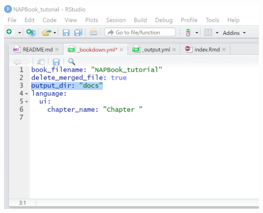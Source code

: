\documentclass[
]{book}
\begin{document}
\begin{enumerate}
  \includegraphics{tutorial_screenshots/add_docs_to_bkdnyaml.png}
\end{enumerate}
\end{document}
